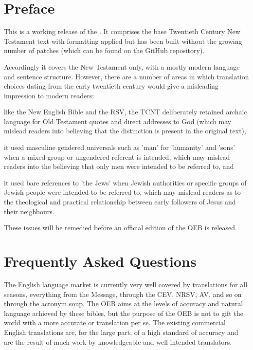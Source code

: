 
\section{Preface}

This is a working release of the . It comprises the base Twentieth Century New Testament text with formatting applied but has been built without the growing number of patches (which can be found on the GitHub repository).

Accordingly it covers the New Testament only, with a mostly modern language and sentence structure. However, there are a number of areas in which translation choices dating from the early twentieth century would give a misleading impression to modern readers:

\startitemize
\item
  like the New English Bible and the RSV, the TCNT deliberately retained archaic language for Old Testament quotes and direct addresses to God (which may mislead readers into believing that the distinction is present in the original text),
\item
  it used masculine gendered universals such as 'man' for 'humanity' and 'sons' when a mixed group or ungendered referent is intended, which may mislead readers into the believing that only men were intended to be referred to, and
\item
  it used bare references to 'the Jews' when Jewish authorities or specific groups of Jewish people were intended to be referred to, which may mislead readers as to the theological and practical relationship between early followers of Jesus and their neighbours.
\stopitemize

These issues will be remedied before an official edition of the OEB is released.

\section{Frequently Asked Questions}


The English language market is currently very well covered by
translations for all seasons, everything from the Message, through
the CEV, NRSV, AV, and so on through the acronym soup. The OEB aims
at the levels of accuracy and natural language achieved by these
bibles, but the purpose of the OEB is not to gift the world with a
more accurate or  translation per se. The existing
commercial English translations are, for the large part, of a high
standard of accuracy and are the result of much work by
knowledgeable and well intended translators.

